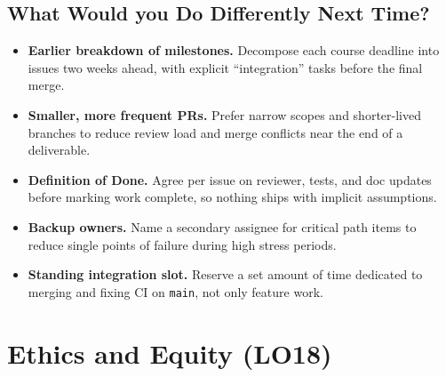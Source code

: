 \documentclass{article}
\begin{document}
\subsection{What Would you Do Differently Next Time?}

\begin{itemize}
  \item \textbf{Earlier breakdown of milestones.} Decompose each course deadline into issues two weeks ahead, with explicit ``integration'' tasks before the final merge.
  \item \textbf{Smaller, more frequent PRs.} Prefer narrow scopes and shorter-lived branches to reduce review load and merge conflicts near the end of a deliverable.
  \item \textbf{Definition of Done.} Agree per issue on reviewer, tests, and doc updates before marking work complete, so nothing ships with implicit assumptions.
  \item \textbf{Backup owners.} Name a secondary assignee for critical path items to reduce single points of failure during high stress periods.
  \item \textbf{Standing integration slot.} Reserve a set amount of time dedicated to merging and fixing CI on \texttt{main}, not only feature work.
\end{itemize}

\section{Ethics and Equity (LO18)}
\label{sec:lo18_ethics}
\end{document}
